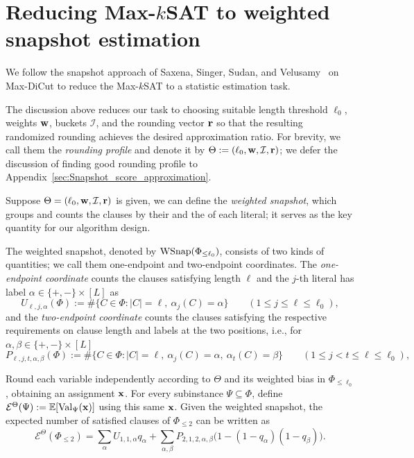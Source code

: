 \section{Reducing \texorpdfstring{Max-$k$SAT}{Max-kSAT} to weighted snapshot estimation}
\label{sec:weighted-snapshot-reduction}



We follow the snapshot approach of Saxena, Singer, Sudan, and Velusamy~\cite{saxena2023improved} on Max-DiCut to reduce the Max-$k$SAT to a statistic  estimation task.




The discussion above reduces our task to choosing suitable length threshold $\ell_0$, weights $\mathbf{w}$,  buckets $\mathcal{I}$, and the  rounding vector $\mathbf{r}$ so that the resulting randomized rounding achieves the desired approximation ratio. For brevity, we call them the \textit{rounding profile}  and denote it by $\Theta: =(\ell_0, \mathbf{w},\mathcal{I} ,\mathbf{r})$; we defer the discussion of finding good rounding profile to Appendix~\ref{sec:Snapshot_score_approximation}.



Suppose $\Theta =(\ell_0, \mathbf{w},\mathcal{I} ,\mathbf{r})$ is given, we can define the \textit{weighted snapshot}, which groups and counts the clauses by their  and the  of each literal; it  serves as the key quantity for our algorithm design.
\begin{definition}
\label{def:weighted-snapshot}
    The weighted snapshot, denoted by $\operatorname{WSnap}(\Phi_{\le \ell_0})$, consists of two kinds of quantities; we call them one-endpoint and two-endpoint coordinates.   The
    \textit{one-endpoint coordinate} counts the clauses satisfying length $\ell$ and the $j$-th literal has label $\alpha\in \{+,-\}\times [L]$ as   \[
  U_{\ell,j,\alpha}(\Phi):=\#\{C\in\Phi:|C|=\ell,\ \alpha_j(C)=\alpha\}
  \qquad(1\le j\le \ell\le \ell_0),
\]
and the \textit{two-endpoint coordinate}  counts the clauses satisfying  the respective requirements on clause length and  labels at the two positions, i.e., for $\alpha,\beta \in  \{+,-\}\times [L]$ 
\[
  P_{\ell,j,t,\alpha,\beta}(\Phi):=
  \#\{C\in\Phi:|C|=\ell,\ \alpha_j(C)=\alpha,\ \alpha_t(C)=\beta\}
  \qquad(1\le j<t\le\ell\le\ell_0),
\]
\end{definition}


\medskip
Round each variable independently according to $\Theta$ and its weighted bias in $\Phi_{\le\ell_0}$, obtaining an assignment $\mathbf{x}$. For every subinstance $\Psi\subseteq\Phi$, define $\mathcal E^\Theta(\Psi):=\mathbb E[\operatorname{Val}_\Psi(\mathbf{x})]$ using this same $\mathbf{x}$.
Given the weighted snapshot, 
the expected number of satisfied clauses of  $\Phi_{\le 2}$ can be written as  \begin{equation}
  \label{eq:expect_2_term}
  \mathcal{E}^{\Theta}(\Phi_{\le 2}) = \sum_\alpha U_{1,1,\alpha}q_\alpha +\sum_{\alpha,\beta}P_{2,1,2,\alpha,\beta} \bigl(1-(1-q_\alpha)(1-q_\beta)\bigr).
\end{equation}

